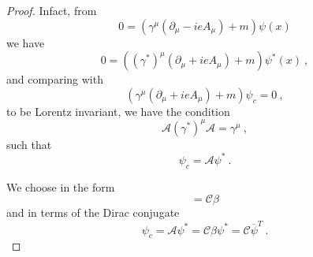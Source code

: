     \begin{proof}
        Infact, from
        \begin{equation*}
            0 = (\gamma^\mu ( \partial_\mu - i e A_\mu ) + m) \psi (x) 
        \end{equation*}
        we have 
        \begin{equation*}
            0 = ((\gamma^*)^\mu ( \partial_\mu + i e A_\mu ) + m) \psi^* (x) ~,
        \end{equation*}
        and comparing with 
        \begin{equation*}
            (\gamma^\mu (\partial_\mu + i e A_\mu) + m) \psi_c = 0 ~,
        \end{equation*}
        to be Lorentz invariant, we have the condition 
        \begin{equation*}
            \mathcal A (\gamma^*)^\mu \mathcal A = \gamma^\mu ~,
        \end{equation*}
        such that 
        \begin{equation*}
            \psi_c = \mathcal A \psi^* ~.
        \end{equation*}

        We choose in the form
        \begin{equation*}
            \mathcal = \mathcal C \beta
        \end{equation*}
        and in terms of the Dirac conjugate
        \begin{equation*}
            \psi_c = \mathcal A \psi^* = \mathcal C \beta \psi^* = \mathcal C \overline \psi^T ~.
        \end{equation*}


\end{proof}

